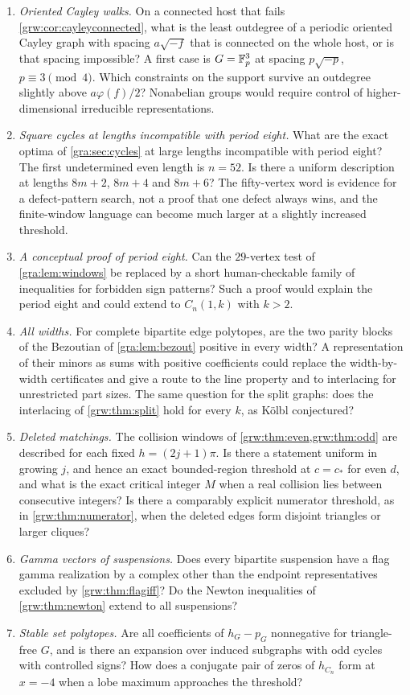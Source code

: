 \begin{enumerate}
\item \emph{Oriented Cayley walks.} On a connected host that fails
\cref{grw:cor:cayleyconnected}, what is the least outdegree of a periodic
oriented Cayley graph with spacing $a\sqrt{-f}$ that is connected on the whole
host, or is that spacing impossible? A first case is $G=\mathbb{F}_p^3$ at spacing
$p\sqrt{-p}$, $p\equiv3\pmod4$. Which constraints on the support survive an
outdegree slightly above $a\varphi(f)/2$? Nonabelian groups would require
control of higher-dimensional irreducible representations.
\item \emph{Square cycles at lengths incompatible with period eight.}
What are the exact optima of \cref{gra:sec:cycles} at large lengths
incompatible with period eight? The first undetermined even length is
$n=52$. Is there a uniform
description at lengths $8m+2$, $8m+4$ and $8m+6$? The fifty-vertex word is
evidence for a defect-pattern search, not a proof that one defect always
wins, and the finite-window language can become much larger at a slightly
increased threshold.
\item \emph{A conceptual proof of period eight.} Can the $29$-vertex test
of \cref{gra:lem:windows} be replaced by a short human-checkable family
of inequalities for forbidden sign patterns? Such a proof would explain
the period eight and could extend to $C_n(1,k)$ with $k>2$.
\item \emph{All widths.} For complete bipartite edge polytopes, are the
two parity blocks of the Bezoutian of \cref{gra:lem:bezout} positive in
every width? A representation of their minors as sums with positive
coefficients could replace the width-by-width certificates and give a
route to the line property and to interlacing for unrestricted part
sizes. The same question for the split graphs: does the interlacing of
\cref{grw:thm:split} hold for every $k$, as K\"olbl conjectured?
\item \emph{Deleted matchings.} The collision windows of
\cref{grw:thm:even,grw:thm:odd} are described for each fixed $h=(2j+1)\pi$.
Is there a statement uniform in growing $j$, and hence an exact
bounded-region threshold at $c=c_*$ for even $d$, and what is the exact
critical integer $M$ when a real collision lies between consecutive
integers? Is there a comparably explicit numerator threshold, as in
\cref{grw:thm:numerator}, when the deleted edges form disjoint triangles or
larger cliques?
\item \emph{Gamma vectors of suspensions.} Does every bipartite suspension
have a flag gamma realization by a complex other than the endpoint
representatives excluded by \cref{grw:thm:flagiff}? Do the Newton
inequalities of \cref{grw:thm:newton} extend to all suspensions?
\item \emph{Stable set polytopes.} Are all coefficients of $h_G-p_G$
nonnegative for triangle-free $G$, and is there an expansion over induced
subgraphs with odd cycles with controlled signs? How does a conjugate pair of
zeros of $h_{C_n}$ form at $x=-4$ when a lobe maximum approaches the
threshold?
\end{enumerate}
